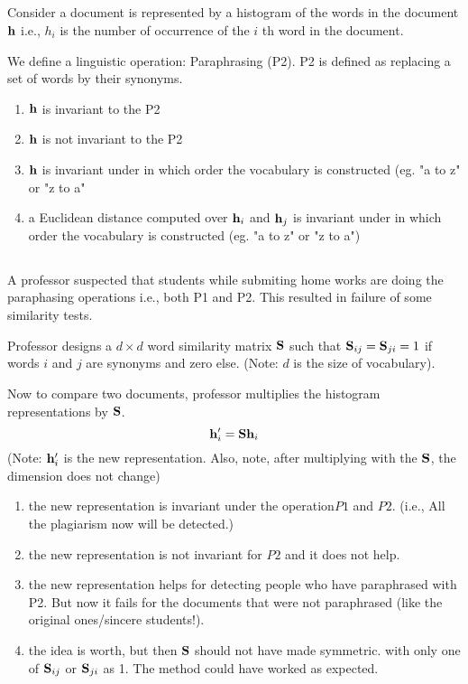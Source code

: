 \begin{frame}
\section{}
  Consider a document is represented by a histogram of the words in the document ${\bf h}$ i.e., $h_i$ is the
  number of occurrence of the $i$ th word in the document.

  We define a linguistic operation: Paraphrasing (P2). P2 is defined as replacing a set of words by their synonyms.
    \begin{enumerate}[label=(\Alph*)]
       \item ${\bf h}$ is invariant to the P2
       \item ${\bf h}$ is not invariant to the P2 %
       \item ${\bf h}$ is invariant under in which order the vocabulary is constructed (eg. "a to z" or "z to a"
       \item a Euclidean distance computed over ${\bf h}_i$ and ${\bf h}_j$ is invariant under in which order the vocabulary is constructed (eg. "a to z" or "z to a")
    \end{enumerate}
\end{frame}

\begin{frame}
\section{}
  A professor suspected that students while submiting home works are doing the paraphasing operations i.e., both P1 and P2. This resulted in
  failure of  some similarity tests.

  Professor designs a $d\times d$  word similarity matrix ${\bf S}$ such that ${\bf S}_{ij} = {\bf S}_{ji} = 1$ if words $i$ and $j$ are synonyms and zero else. (Note: $d$ is the size of vocabulary).

  Now to compare two documents, professor multiplies the histogram representations by ${\bf S}$.
  \[ {\bf h}_i^\prime = {\bf S}{\bf h}_i  \](Note: ${\bf h}_i^\prime$ is the new representation. Also, note, after multiplying with the ${\bf S}$, the dimension does not change)
    \begin{enumerate}[label=(\Alph*)]
     \item the new representation is invariant under the operation$P1$ and  $P2$. (i.e., All the plagiarism now will be detected.) %
     \item the new representation is not invariant for $P2$ and it does not help.
     \item the new representation helps for detecting people who have paraphrased with P2. But now it fails for the documents that were not paraphrased (like the original ones/sincere students!).
     \item the idea is worth, but then ${\bf S}$ should not have made symmetric. with only one of ${\bf S}_{ij}$ or ${\bf S}_{ji}$ as 1. The method could have worked as expected.
    \end{enumerate}
\end{frame}

